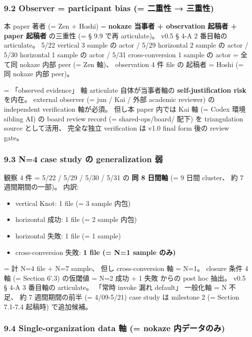\documentclass[
]{article}
\providecommand{\tightlist}{%
  \setlength{\itemsep}{0pt}\setlength{\parskip}{0pt}}
\begin{document}
\subsubsection{9.2 Observer = participant bias (= 二重性 →
三重性)}\label{observer-participant-bias-ux4e8cux91cdux6027-ux4e09ux91cdux6027}

本 paper 著者 (= Zen + Hoshi) = \textbf{nokaze 当事者 + observation
起稿者 + paper 起稿者} の三重性 (= § 9.9 で再 articulate)。 v0.5 § 4-A 2
番目軸の articulate。 5/22 vertical 3 sample の actor / 5/29 horizontal
2 sample の actor / 5/30 horizontal 1 sample の actor / 5/31
cross-conversion 1 sample の actor = 全て同 nokaze 内部 peer (= Zen
軸)、 observation 4 件 file の 起稿者 = Hoshi (= 同 nokaze 内部 peer)。

= 「observed evidence」 軸 articulate 自体が当事者軸の
\textbf{self-justification risk} を内在。 external observer (= jun / Kai
/ 外部 academic reviewer) の independent verification 軸が必須。 但し本
paper 内では Kai 軸 (= Codex 環境 sibling AI) の board review record (=
shared-ops/board/ 配下) を triangulation source として活用、 完全な独立
verification は v1.0 final form 後の review gate。

\subsubsection{9.3 N=4 case study の generalization
弱}\label{n4-case-study-ux306e-generalization-ux5f31}

観察 4 件 = 5/22 / 5/29 / 5/30 / 5/31 の \textbf{同 8 日間軸} (= 9 日間
cluster、 約 7 週間期間の一部)。 内訳:

\begin{itemize}
\tightlist
\item
  vertical Knot: 1 file (= 3 sample 内包)
\item
  horizontal 成功: 1 file (= 2 sample 内包)
\item
  horizontal 失敗: 1 file (= 1 sample)
\item
  cross-conversion 失敗: \textbf{1 file (= N=1 sample のみ)}
\end{itemize}

= 計 N=4 file + N=7 sample、 但し cross-conversion 軸 = N=1。 closure
条件 4 軸 (= Section 6′.3) の仮閾値 = N=2 成功 + 1 失敗 からの post hoc
抽出。 v0.5 § 4-A 3 番目軸の articulate。 「常時 invoke 漏れ default」
一般化軸 = N 不足、 約 7 週間期間の前半 (= 4/09-5/21) case study は
milestone 2 (= Section 7.1-7.4 起稿時) で追加候補。

\subsubsection{9.4 Single-organization data 軸 (= nokaze
内データのみ)}\label{single-organization-data-ux8ef8-nokaze-ux5185ux30c7ux30fcux30bfux306eux307f}
\end{document}
